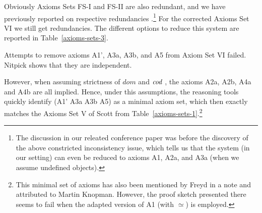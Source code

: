 Obviously Axioms Sets FS-I and FS-II are also redundant, and we have previously reported 
on respective redundancies \cite{ICMS}.\footnote{The discussion in our releated
  conference paper \cite{ICMS} was before the discovery of the above 
constricted inconsistency issue, which tells us that the system (in our setting) can even be reduced 
to axioms A1, A2a, and A3a (when we assume undefined objects).} For
the corrected Axioms Set VI we still get redundancies. The different options to reduce this system are reported in
Table~\ref{axioms-sets-3}.

Attempts to remove axioms A1', A3a, A3b, and A5 from Axiom Set VI failed. Nitpick shows that they are independent. 

However, when assuming strictness of $dom$ and $\textit{cod \/}$, the axioms
A2a, A2b, A4a and A4b are all implied. Hence, under this 
   assumptions, the reasoning tools quickly identify (A1' A3a A3b A5) as a minimal axiom 
   set, which then exactly matches the Axioms Set V of Scott from Table~\ref{axioms-sets-1}.\footnote{This minimal set of axioms 
   has also been mentioned by Freyd in a note \cite{Freyd16} and attributed to Martin Knopman. However, the proof
   sketch presented there seems to fail when the adapted version of A1 (with $\simeq$) is employed.}




